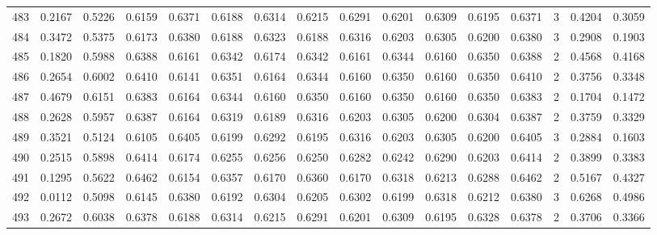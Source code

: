 \begin{tabular}{lrrrrrrrrrrrrrrr}
483 &      0.2167 &  0.5226 &  0.6159 &  0.6371 &  0.6188 &  0.6314 &  0.6215 &  0.6291 &  0.6201 &  0.6309 &   0.6195 &     0.6371 &      3 &                    0.4204 &                     0.3059 \\
484 &      0.3472 &  0.5375 &  0.6173 &  0.6380 &  0.6188 &  0.6323 &  0.6188 &  0.6316 &  0.6203 &  0.6305 &   0.6200 &     0.6380 &      3 &                    0.2908 &                     0.1903 \\
485 &      0.1820 &  0.5988 &  0.6388 &  0.6161 &  0.6342 &  0.6174 &  0.6342 &  0.6161 &  0.6344 &  0.6160 &   0.6350 &     0.6388 &      2 &                    0.4568 &                     0.4168 \\
486 &      0.2654 &  0.6002 &  0.6410 &  0.6141 &  0.6351 &  0.6164 &  0.6344 &  0.6160 &  0.6350 &  0.6160 &   0.6350 &     0.6410 &      2 &                    0.3756 &                     0.3348 \\
487 &      0.4679 &  0.6151 &  0.6383 &  0.6164 &  0.6344 &  0.6160 &  0.6350 &  0.6160 &  0.6350 &  0.6160 &   0.6350 &     0.6383 &      2 &                    0.1704 &                     0.1472 \\
488 &      0.2628 &  0.5957 &  0.6387 &  0.6164 &  0.6319 &  0.6189 &  0.6316 &  0.6203 &  0.6305 &  0.6200 &   0.6304 &     0.6387 &      2 &                    0.3759 &                     0.3329 \\
489 &      0.3521 &  0.5124 &  0.6105 &  0.6405 &  0.6199 &  0.6292 &  0.6195 &  0.6316 &  0.6203 &  0.6305 &   0.6200 &     0.6405 &      3 &                    0.2884 &                     0.1603 \\
490 &      0.2515 &  0.5898 &  0.6414 &  0.6174 &  0.6255 &  0.6256 &  0.6250 &  0.6282 &  0.6242 &  0.6290 &   0.6203 &     0.6414 &      2 &                    0.3899 &                     0.3383 \\
491 &      0.1295 &  0.5622 &  0.6462 &  0.6154 &  0.6357 &  0.6170 &  0.6360 &  0.6170 &  0.6318 &  0.6213 &   0.6288 &     0.6462 &      2 &                    0.5167 &                     0.4327 \\
492 &      0.0112 &  0.5098 &  0.6145 &  0.6380 &  0.6192 &  0.6304 &  0.6205 &  0.6302 &  0.6199 &  0.6318 &   0.6212 &     0.6380 &      3 &                    0.6268 &                     0.4986 \\
493 &      0.2672 &  0.6038 &  0.6378 &  0.6188 &  0.6314 &  0.6215 &  0.6291 &  0.6201 &  0.6309 &  0.6195 &   0.6328 &     0.6378 &      2 &                    0.3706 &                     0.3366 \\

\end{tabular}

